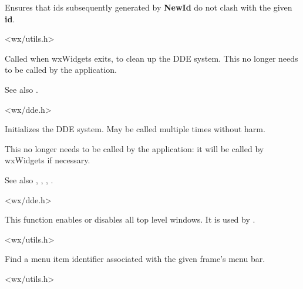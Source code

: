Ensures that ids subsequently generated by {\bf NewId} do not clash with
the given {\bf id}.


<wx/utils.h>


\label{wxddecleanup}


Called when wxWidgets exits, to clean up the DDE system. This no longer needs to be
called by the application.

See also .


<wx/dde.h>


\label{wxddeinitialize}


Initializes the DDE system. May be called multiple times without harm.

This no longer needs to be called by the application: it will be called
by wxWidgets if necessary.

See also , , ,\rtfsp
{}.


<wx/dde.h>


\label{wxenabletoplevelwindows}


This function enables or disables all top level windows. It is used by
.


<wx/utils.h>


\label{wxfindmenuitemid}


Find a menu item identifier associated with the given frame's menu bar.


<wx/utils.h>


\label{wxfindwindowbylabel}

